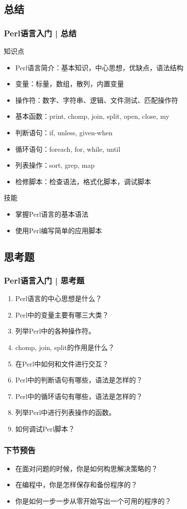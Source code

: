 \subsection{总结}
\begin{frame}
  \frametitle{Perl语言入门 | 总结}
  \begin{block}{知识点}
    \begin{itemize}
      \item Perl语言简介：基本知识，中心思想，优缺点，语法结构
      \item 变量：标量，数组，散列，内置变量
      \item 操作符：数字、字符串、逻辑、文件测试、匹配操作符
      \item 基本函数：print, chomp, join, split, open, close, my
      \item 判断语句：if, unless, given-when
      \item 循环语句：foreach, for, while, until
      \item 列表操作：sort, grep, map
      \item 检修脚本：检查语法，格式化脚本，调试脚本
    \end{itemize}
  \end{block}
  \begin{block}{技能}
    \begin{itemize}
      \item 掌握Perl语言的基本语法
      \item 使用Perl编写简单的应用脚本
    \end{itemize}
  \end{block}
\end{frame}

\subsection{思考题}
\begin{frame}
  \frametitle{Perl语言入门 | 思考题}
  \begin{enumerate}
    \item Perl语言的中心思想是什么？
    \item Perl中的变量主要有哪三大类？
    \item 列举Perl中的各种操作符。
    \item chomp, join, split的作用是什么？
    \item 在Perl中如何和文件进行交互？
    \item Perl中的判断语句有哪些，语法是怎样的？
    \item Perl中的循环语句有哪些，语法是怎样的？
    \item 列举Perl中进行列表操作的函数。
    \item 如何调试Perl脚本？
  \end{enumerate}
\end{frame}

\begin{frame}
  \frametitle{下节预告}
  \begin{itemize}
    \item 在面对问题的时候，你是如何构思解决策略的？
    \item 在编程中，你是怎样保存和备份程序的？
    \item 你是如何一步一步从零开始写出一个可用的程序的？
  \end{itemize}
\end{frame}



